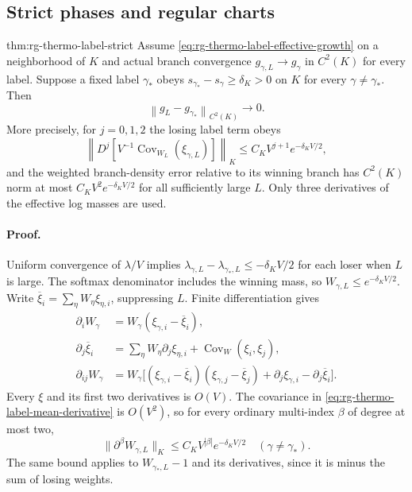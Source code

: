 \subsection{Strict phases and regular charts}
\label{sec:rg-thermo-label-strict}

{thm:rg-thermo-label-strict}
Assume \cref{eq:rg-thermo-label-effective-growth} on a neighborhood of
$K$ and actual branch convergence $g_{\gamma,L}\to g_\gamma$ in
$C^2(K)$ for every label. Suppose a fixed label $\gamma_*$ obeys
$s_{\gamma_*}-s_\gamma\geq\delta_K>0$ on $K$ for every
$\gamma\ne\gamma_*$. Then
\begin{equation}
 \left\|g_L-g_{\gamma_*}\right\|_{C^2(K)}\longrightarrow0.
 \label{eq:rg-thermo-label-strict-limit}
\end{equation}
More precisely, for $j=0,1,2$ the losing label term obeys
\begin{equation}
 \left\|D^j\left[V^{-1}
       \operatorname{Cov}_{W_L}(\xi_{\gamma,L})\right]\right\|_{K}
 \leq C_K V^{j+1}e^{-\delta_KV/2},
 \label{eq:rg-thermo-label-strict-covariance-bound}
\end{equation}
and the weighted branch-density error relative to its winning branch
has $C^2(K)$ norm at most $C_KV^2e^{-\delta_KV/2}$ for all sufficiently
large $L$. Only three derivatives of the effective log masses are used.\thermoestablishedstatus


\paragraph{Proof.}
Uniform convergence of $\lambda/V$ implies
$\lambda_{\gamma,L}-\lambda_{\gamma_*,L}\leq-\delta_KV/2$ for each
loser when $L$ is large. The softmax denominator includes the winning
mass, so $W_{\gamma,L}\leq e^{-\delta_KV/2}$. Write
$\overline\xi_i=\sum_\eta W_\eta\xi_{\eta,i}$, suppressing $L$.
Finite differentiation gives
\begin{align}
 \partial_iW_\gamma&=W_\gamma(\xi_{\gamma,i}-\overline\xi_i),
 \label{eq:rg-thermo-label-weight-first}\\
 \partial_j\overline\xi_i
 &=\sum_\eta W_\eta\partial_j\xi_{\eta,i}
                  +\operatorname{Cov}_W(\xi_i,\xi_j),
 \label{eq:rg-thermo-label-mean-derivative}\\
 \partial_{ij}W_\gamma
 &=W_\gamma\big[(\xi_{\gamma,i}-\overline\xi_i)
                  (\xi_{\gamma,j}-\overline\xi_j)
             +\partial_j\xi_{\gamma,i}-\partial_j\overline\xi_i\big].
 \label{eq:rg-thermo-label-weight-second}
\end{align}
Every $\xi$ and its first two derivatives is $O(V)$. The covariance in
\cref{eq:rg-thermo-label-mean-derivative} is $O(V^2)$, so for every
ordinary multi-index $\beta$ of degree at most two,
\begin{equation}
 \|\partial^\beta W_{\gamma,L}\|_K
 \leq C_K V^{|\beta|}e^{-\delta_KV/2}
       \quad(\gamma\ne\gamma_*).
 \label{eq:rg-thermo-label-losing-derivatives}
\end{equation}
The same bound applies to $W_{\gamma_*,L}-1$ and its derivatives,
since it is minus the sum of losing weights.

